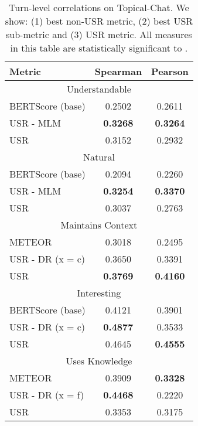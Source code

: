 \documentclass[11pt,a4paper]{article}
\begin{document}
\begin{table}
\centering
\begin{tabular}{|l|c|c|}
\hline
Metric                    & Spearman & Pearson  \\\hline
\multicolumn{3}{|c|}{Understandable} \\ \hline
BERTScore (base)          & 0.2502   & 0.2611   \\
USR - MLM                       & \textbf{0.3268}   & \textbf{0.3264}   \\
USR                       & 0.3152   & 0.2932   \\
\hline
\multicolumn{3}{|c|}{Natural} \\ \hline
BERTScore (base)          & 0.2094   & 0.2260   \\
USR - MLM                       & \textbf{0.3254}   & \textbf{0.3370}  \\
USR                       & 0.3037   & 0.2763   \\\hline
\multicolumn{3}{|c|}{Maintains Context} \\ \hline
METEOR                    & 0.3018   & 0.2495   \\
USR - DR (x = c)   & 0.3650  & 0.3391   \\
USR                       & \textbf{0.3769}   & \textbf{0.4160}   \\\hline
\multicolumn{3}{|c|}{Interesting} \\ \hline
BERTScore (base)          & 0.4121   & 0.3901  \\
USR - DR (x = c)   & \textbf{0.4877}   &  0.3533   \\
USR                       & 0.4645   & \textbf{0.4555}   \\\hline
\multicolumn{3}{|c|}{Uses Knowledge} \\ \hline
METEOR                    & 0.3909  & \textbf{0.3328}   \\
USR - DR (x = f)   & \textbf{0.4468}   &  0.2220   \\
USR                       & 0.3353   & 0.3175   \\\hline

\end{tabular}
\caption{Turn-level correlations on Topical-Chat. We show: (1) best non-USR metric, (2) best USR sub-metric and (3) USR metric. All measures in this table are statistically significant to .}
\label{tab:all_turn}
\end{table}
\end{document}
